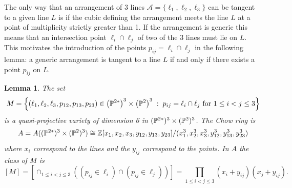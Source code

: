 \documentclass[12pt]{article}
\theoremstyle{plain}
\newtheorem{lemma}[theorem]{Lemma}
\theoremstyle{definition}
\newcommand{\A}{\mathcal{A}}
\newcommand{\Z}{\mathbb{Z}}
\renewcommand{\P}{\ensuremath \mathbb{P}}
\begin{document}
The only way that an arrangement of 3 lines $\A=\{\ell_1,\ell_2,\ell_3\}$ can be tangent to a given line $L$ is if the cubic defining the arrangement meets the line $L$ at a point of multiplicity strictly greater than 1. If the arrangement is generic this means that an intersection point $\ell_i\cap \ell_j$ of two of the 3 lines must lie on $L$. This motivates the introduction of the points $p_{ij}=\ell_i\cap \ell_j$ in the following lemma: a generic arrangement is tangent to a line $L$ if and only if there exists a point $p_{ij}$ on $L$. 

\begin{lemma}\label{3linesM}
The set
$$ M = \left\{(\ell_1,\ell_2,\ell_3,p_{12},p_{13},p_{23}) \in 
\left( \P^{2*}\right)^3 \times \left( \P^2 \right)^3\; : \; p_{ij} =
\ell_i \cap \ell_j  \text{ for $1 \leq i < j \leq 3$} \right\}$$ 
is a quasi-projective variety of dimension 6 in $(\P^{2*})^3\times (\P^{2})^3$. The Chow ring is $$A=A((\P^{2*})^3\times (\P^{2})^3)\cong \Z[x_1,x_2,x_3,y_{12},y_{13},y_{23}]/(x_1^3,x_2^3,x_3^3,y_{12}^3,y_{13}^3,y_{23}^3)$$ where $x_i$ correspond to the lines and the $y_{ij}$ correspond to the points. In $A$ the class of $M$ is $$[M]=\left[\cap_{1 \leq i < j \leq 3} \left( (p_{ij} \in \ell_i) \cap (p_{ij}
\in \ell_j)\right)\right] = \prod_{1 \leq i < j \leq 3} (x_i 
+ y_{ij})(x_j + y_{ij}) .$$

\end{lemma}
\end{document}
